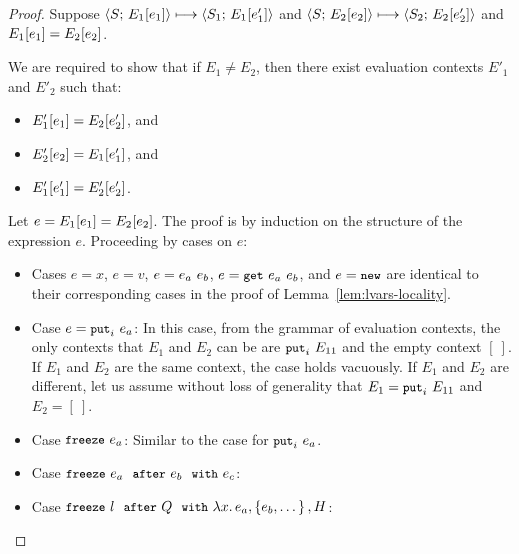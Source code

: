 \begin{proof}
  Suppose $\langle S;\, E_1\hspace{-0.5mm}\left[e_1\right] \rangle \longmapsto \langle S_1;\, E_1\hspace{-0.5mm}\left[e'_1\right] \rangle$ and
  $\langle S;\, E_2\hspace{-0.5mm}\left[e_2\right] \rangle \longmapsto
  \langle S_2;\, E_2\hspace{-0.5mm}\left[e'_2\right] \rangle$ and $E_1\hspace{-0.5mm}\left[e_1\right] =
  E_2\hspace{-0.5mm}\left[e_2\right]$.

  We are required to show that if $E_1 \neq E_2$, then there exist
  evaluation contexts $E'_1$ and $E'_2$ such that:
  \begin{itemize}
  \item $E'_1\hspace{-0.5mm}\left[e_1\right] = E_2\hspace{-0.5mm}\left[e'_2\right]$, and
  \item $E'_2\hspace{-0.5mm}\left[e_2\right] = E_1\hspace{-0.5mm}\left[e'_1\right]$, and
  \item $E'_1\hspace{-0.5mm}\left[e'_1\right] = E'_2\hspace{-0.5mm}\left[e'_2\right]$.
  \end{itemize}

  Let $e = E_1\hspace{-0.5mm}\left[e_1\right] = E_2\hspace{-0.5mm}\left[e_2\right]$.  The proof is
  by induction on the structure of the expression $e$.  Proceeding by
  cases on $e$:

  \begin{itemize}

    \item Cases $e = x$, $e = v$, $e = e_a~e_b$, $e = \mbox{\small{\texttt{get}}}~e_a~e_b$, and
      $e = \mbox{\small{\texttt{new}}}$ are identical to their corresponding cases in the proof
      of Lemma~\ref{lem:lvars-locality}.

    \item Case $e = \mbox{\small{\texttt{put}}}_i~e_a$: In this case, from the grammar of
      evaluation contexts, the only contexts that $E_1$ and $E_2$ can
      be are $\mbox{\small{\texttt{put}}}_i~E_{11}$ and the empty context $[~]$.  If $E_1$
      and $E_2$ are the same context, the case holds vacuously.  If
      $E_1$ and $E_2$ are different, let us assume without loss of
      generality that $E_1 = \mbox{\small{\texttt{put}}}_i~E_{11}$ and $E_2 = [~]$. 

    \item Case $\mbox{\small{\texttt{freeze}}}~e_a$: Similar to the case for $\mbox{\small{\texttt{put}}}_i~e_a$.

    \item Case $\mbox{\small{\texttt{freeze}}}~e_a~~{\mbox{\small{\texttt{after}}}}~e_b~~{\mbox{\small{\texttt{with}}}}~e_c$: 

    \item Case $\mbox{\small{\texttt{freeze}}}~l~~{\mbox{\small{\texttt{after}}}}~Q~~{\mbox{\small{\texttt{with}}}}~\lambda x.\,e_a, \left\{e_b, \dots\right\}, H$: 

  \end{itemize}
\end{proof}

